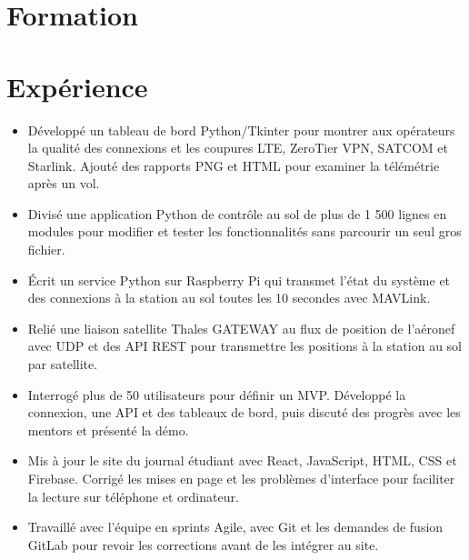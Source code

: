

\header

\section{Formation}

\section{Expérience}
\begin{itemize}
  \item Développé un tableau de bord Python/Tkinter pour montrer aux opérateurs la qualité des connexions et les coupures LTE, ZeroTier VPN, SATCOM et Starlink. Ajouté des rapports PNG et HTML pour examiner la télémétrie après un vol.
  \item Divisé une application Python de contrôle au sol de plus de 1 500 lignes en modules pour modifier et tester les fonctionnalités sans parcourir un seul gros fichier.
  \item Écrit un service Python sur Raspberry Pi qui transmet l’état du système et des connexions à la station au sol toutes les 10 secondes avec MAVLink.
  \item Relié une liaison satellite Thales GATEWAY au flux de position de l’aéronef avec UDP et des API REST pour transmettre les positions à la station au sol par satellite.
\end{itemize}
\begin{itemize}
  \item Interrogé plus de 50 utilisateurs pour définir un MVP. Développé la connexion, une API et des tableaux de bord, puis discuté des progrès avec les mentors et présenté la démo.
\end{itemize}
\begin{itemize}
  \item Mis à jour le site du journal étudiant avec React, JavaScript, HTML, CSS et Firebase. Corrigé les mises en page et les problèmes d’interface pour faciliter la lecture sur téléphone et ordinateur.
  \item Travaillé avec l’équipe en sprints Agile, avec Git et les demandes de fusion GitLab pour revoir les corrections avant de les intégrer au site.
\end{itemize}

